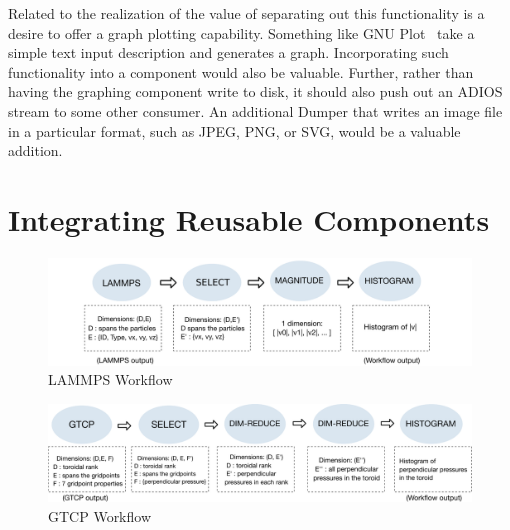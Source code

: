 \documentclass[conference]{IEEEtran}
\begin{document}
Related to the realization of the value of separating out this functionality is
a desire to offer a graph plotting capability. Something like GNU
Plot~\cite{racine:2006:gnuplot} take a simple text input description and
generates a graph.  Incorporating such functionality into a component would
also be valuable.  Further, rather than having the graphing component write to
disk, it should also push out an ADIOS stream to some other consumer. An
additional Dumper that writes an image file in a particular format, such as
JPEG, PNG, or SVG, would be a valuable addition.

\section{Integrating Reusable Components}
\label{s:integrating-reusable-components}


\begin{figure}
  \includegraphics[width=\linewidth]{fig/wflow3}
  \caption{LAMMPS Workflow}
  \label{fig:lammps-workflow}
\end{figure}

\begin{figure}
  \includegraphics[width=\linewidth]{fig/wflow4}
  \caption{GTCP Workflow}
  \label{fig:gtcp-workflow}
\end{figure}
\end{document}
